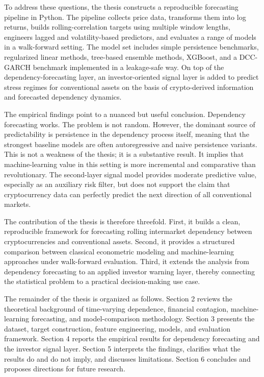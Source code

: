 To address these questions, the thesis constructs a reproducible forecasting pipeline in Python. The pipeline collects price data, transforms them into log returns, builds rolling-correlation targets using multiple window lengths, engineers lagged and volatility-based predictors, and evaluates a range of models in a walk-forward setting. The model set includes simple persistence benchmarks, regularized linear methods, tree-based ensemble methods, XGBoost, and a DCC-GARCH benchmark implemented in a leakage-safe way. On top of the dependency-forecasting layer, an investor-oriented signal layer is added to predict stress regimes for conventional assets on the basis of crypto-derived information and forecasted dependency dynamics.

The empirical findings point to a nuanced but useful conclusion. Dependency forecasting works. The problem is not random. However, the dominant source of predictability is persistence in the dependency process itself, meaning that the strongest baseline models are often autoregressive and naive persistence variants. This is not a weakness of the thesis; it is a substantive result. It implies that machine-learning value in this setting is more incremental and comparative than revolutionary. The second-layer signal model provides moderate predictive value, especially as an auxiliary risk filter, but does not support the claim that cryptocurrency data can perfectly predict the next direction of all conventional markets.

The contribution of the thesis is therefore threefold. First, it builds a clean, reproducible framework for forecasting rolling intermarket dependency between cryptocurrencies and conventional assets. Second, it provides a structured comparison between classical econometric modeling and machine-learning approaches under walk-forward evaluation. Third, it extends the analysis from dependency forecasting to an applied investor warning layer, thereby connecting the statistical problem to a practical decision-making use case.

The remainder of the thesis is organized as follows. Section 2 reviews the theoretical background of time-varying dependence, financial contagion, machine-learning forecasting, and model-comparison methodology. Section 3 presents the dataset, target construction, feature engineering, models, and evaluation framework. Section 4 reports the empirical results for dependency forecasting and the investor signal layer. Section 5 interprets the findings, clarifies what the results do and do not imply, and discusses limitations. Section 6 concludes and proposes directions for future research.
